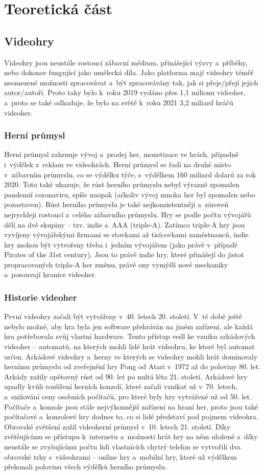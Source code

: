\documentclass[a4paper]{extarticle}
\begin{document}
\setcounter{page}{3}
\setcounter{section}{1}
\section{Teoretická část}
\subsection{Videohry}
Videohry jsou neustále rostoucí zábavní médium, přinášející výzvy a~příběhy, nebo dokonce fungující jako umělecká díla. Jako platforma mají videohry téměř neomezené možnosti zpracovávat a~být zpracovávány tak, jak si přeje/přejí jejich autor/autoři. Proto taky bylo k~roku 2019 vydáno přes 1,1 milionu videoher, a~proto se také odhaduje, že bylo na světě k~roku 2021 3,2 miliard hráčů videoher.
\subsubsection{Herní průmysl}
Herní průmysl zahrnuje vývoj a~prodej her, monetizace ve hrách, případně i~výdělek z~reklam ve videohrách.
Herní průmysl se řadí na druhé místo v~zábavním průmyslu, co se výdělku týče, s~výdělkem 160 miliard dolarů za rok 2020. Toto také ukazuje, že růst herního průmyslu nebyl výrazně zpomalen pandemií coronaviru, spíše naopak (ačkoliv vývoj mnoha her byl zpomalen nebo pozastaven). Růst herního průmyslu je také nejkonzistentněji a~zároveň nejrychleji rostoucí z~celého zábavního průmyslu.
Hry se podle počtu vývojářů dělí na dvě skupiny – tzv. indie a~AAA (triple-A). Zatímco triple-A hry jsou vyvíjeny vývojářskými firmami se stovkami až tisícovkami zaměstnanců, indie hry mohou být vytvořeny třeba i~jedním vývojářem (jako právě v~případě Pirates of the 31st century). Jsou to právě indie hry, které přinášejí do jistot propracovaných tripla-A her změnu, právě ony vymýšlí nové mechaniky a~posouvají hranice videoher.
\subsubsection{Historie videoher}
První videohry začali být vytvářeny v~40. letech 20. století. V~té době ještě nebylo možné, aby hra byla jen software přehráván na jiném zařízení, ale každá hra potřebovala svůj vlastní hardware. Tento přístup vedl ke vzniku arkádových videoher – automatů, na kterých mohli lidé hrát videohru, ke které byl automat určen. Arkádové videohry a~herny ve kterých se videohry mohli hrát dominovaly hernímu průmyslu od zveřejnění hry Pong od Atari v~1972 až do poloviny 80. let. Arkády zažily opětovný růst od 90. let po nultá léta 21. století.
Arkádové hry upadly kvůli rozšíření herních konzolí, které začali vznikat už v~70. letech, a~snižování ceny osobních počítačů, pro které byly hry vytvářené už od 50. let. Počítače a~konzole jsou stále nejvýkonnější zařízení na hraní her, proto jsou také počítačové a~konzolové hry dodnes to, co si lidé představí pod pojmem videohra.
Obrovské zvětšení zažil videoherní průmysl v~10. letech 21. století. Díky zvětšujícímu se přístupu k~internetu a~možnosti hrát hry na něm uložené a~díky neustále se zvyšujícímu počtu lidí vlastnících chytrý telefon se vytvořili dva obrovské trhy s~videohrami – online hry a~mobilní hry, které už výdělkem překonali polovinu všech výdělků herního průmyslu.
\end{document}
